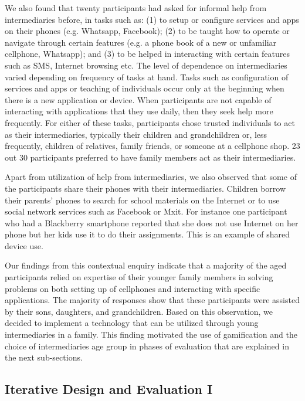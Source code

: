 \documentclass{sig-alternate}
\begin{document}
We also
found that twenty participants had asked for informal help from
intermediaries before, in tasks such as: (1) to setup or configure services
and apps on their phones (e.g. Whatsapp, Facebook); (2) to be taught   how to
operate or navigate through certain features (e.g. a phone book of a new or
unfamiliar cellphone, Whatsapp); and (3) to be helped in interacting with
certain features such as SMS, Internet browsing etc. The level of dependence
on intermediaries varied depending on frequency of tasks at hand. Tasks such
as configuration of services and apps or teaching of individuals occur only at
the beginning when there is a new application or device. When participants
are not capable of interacting with applications that they use daily, then
they seek help more frequently. For either of these tasks, participants
chose trusted individuals to act as their intermediaries, typically
their children and grandchildren or, less frequently, children of relatives, family
friends, or someone at a cellphone shop. 23 out 30 participants preferred to have family
members act as their intermediaries.

Apart from utilization of help from intermediaries, we also observed that some
of the participants share their phones with their intermediaries. Children
borrow  their parents' phones to search for school materials on the Internet
or to use social network services such as Facebook or Mxit. For instance one
participant who had a Blackberry smartphone reported that she does not use
Internet on her phone but her kids use it to do their assignments. This is an
example of shared device use.

Our findings from this contextual enquiry indicate that  a majority of
the aged participants relied on expertise of their younger family members in
solving problems on both setting up of cellphones and interacting with
specific applications.  The majority of responses show that these
participants were assisted by their sons, daughters, and grandchildren. 
Based on this observation, we decided to implement a technology that can be
utilized through young intermediaries in a family. This finding 
motivated the use of gamification and the choice of intermediaries age
group in phases of evaluation that are explained in the next sub-sections.

\subsection{Iterative Design and Evaluation I}
\end{document}
